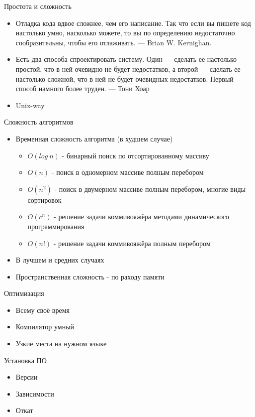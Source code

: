 \documentclass[aspectratio=169]{beamer}
\begin{document}
\begin{frame}{Простота и сложность}
\begin{itemize}
\item Отладка кода вдвое сложнее, чем его написание. Так что если вы пишете код настолько умно, насколько можете, то вы по определению недостаточно сообразительны, чтобы его отлаживать. — Brian W. Kernighan.
\pause
\item Есть два способа спроектировать систему. Один — сделать ее настолько простой, что в ней очевидно не будет недостатков, а второй — сделать ее настолько сложной, что в ней не будет очевидных недостатков. Первый способ намного более труден. — Тони Хоар
\pause
\item Unix-way
\end{itemize}
\end{frame}

\begin{frame}{Сложность алгоритмов}
\begin{itemize}
\item Временная сложность алгоритма (в худшем случае)
\begin{itemize}
\item $O(log \: n)$ - бинарный поиск по отсортированному массиву
\item $O(n)$ - поиск в одномерном массиве полным перебором
\item $O(n^2)$ - поиск в двумерном массиве полным перебором, многие виды сортировок
\item $O(c^n)$ - решение задачи коммивояжёра методами динамического программирования
\item $O(n!)$ - решение задачи коммивояжёра полным перебором
\end{itemize}
\pause
\item В лучшем и средних случаях
\pause
\item Пространственная сложность - по раходу памяти
\end{itemize}
\end{frame}

\begin{frame}{Оптимизация}
\begin{itemize}
\item Всему своё время
\pause
\item Компилятор умный
\pause
\item Узкие места на нужном языке
\end{itemize}
\end{frame}

\begin{frame}{Установка ПО}
\begin{itemize}
\item Версии
\pause
\item Зависимости
\pause
\item Откат
\end{itemize}
\end{frame}
\end{document}
